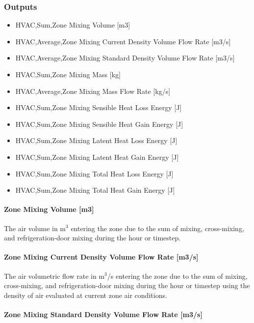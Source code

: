 \subsubsection{Outputs}\label{outputs-5-000}

\begin{itemize}
\item
  HVAC,Sum,Zone Mixing Volume {[}m3{]}
\item
  HVAC,Average,Zone Mixing Current Density Volume Flow Rate {[}m3/s{]}
\item
  HVAC,Average,Zone Mixing Standard Density Volume Flow Rate {[}m3/s{]}
\item
  HVAC,Sum,Zone Mixing Mass {[}kg{]}
\item
  HVAC,Average,Zone Mixing Mass Flow Rate {[}kg/s{]}
\item
  HVAC,Sum,Zone Mixing Sensible Heat Loss Energy {[}J{]}
\item
  HVAC,Sum,Zone Mixing Sensible Heat Gain Energy {[}J{]}
\item
  HVAC,Sum,Zone Mixing Latent Heat Loss Energy {[}J{]}
\item
  HVAC,Sum,Zone Mixing Latent Heat Gain Energy {[}J{]}
\item
  HVAC,Sum,Zone Mixing Total Heat Loss Energy {[}J{]}
\item
  HVAC,Sum,Zone Mixing Total Heat Gain Energy {[}J{]}
\end{itemize}

\paragraph{Zone Mixing Volume {[}m3{]}}\label{zone-mixing-volume-m3-2}

The air volume in m\(^{3}\) entering the zone due to the sum of mixing, cross-mixing, and refrigeration-door mixing during the hour or timestep.

\paragraph{Zone Mixing Current Density Volume Flow Rate {[}m3/s{]}}\label{zone-mixing-current-density-volumetric-flow-rate-m3s-2}

The air volumetric flow rate in m\(^{3}\)/s entering the zone due to the sum of mixing, cross-mixing, and refrigeration-door mixing during the hour or timestep using the density of air evaluated at current zone air conditions.

\paragraph{Zone Mixing Standard Density Volume Flow Rate {[}m3/s{]}}\label{zone-mixing-standard-density-volumetric-flow-rate-m3s-2}

